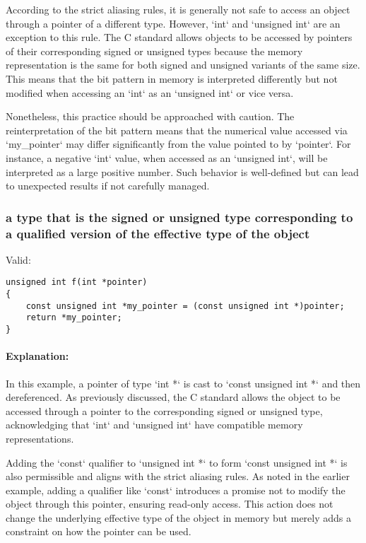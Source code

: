 \documentclass[12pt]{article}
\begin{document}
According to the strict aliasing rules, it is generally not safe to access an object through a pointer of a different type. However, `int` and `unsigned int` are an exception to this rule. The C standard allows objects to be accessed by pointers of their corresponding signed or unsigned types because the memory representation is the same for both signed and unsigned variants of the same size. This means that the bit pattern in memory is interpreted differently but not modified when accessing an `int` as an `unsigned int` or vice versa.

Nonetheless, this practice should be approached with caution. The reinterpretation of the bit pattern means that the numerical value accessed via `my\_pointer` may differ significantly from the value pointed to by `pointer`. For instance, a negative `int` value, when accessed as an `unsigned int`, will be interpreted as a large positive number. Such behavior is well-defined but can lead to unexpected results if not carefully managed.

\subsubsection{a type that is the signed or unsigned type corresponding to a qualified version of the effective type of the object}

Valid:
\begin{verbatim}
unsigned int f(int *pointer)
{
    const unsigned int *my_pointer = (const unsigned int *)pointer;
    return *my_pointer;
}
\end{verbatim}

\paragraph{Explanation:}
In this example, a pointer of type `int *` is cast to `const unsigned int *` and then dereferenced. As previously discussed, the C standard allows the object to be accessed through a pointer to the corresponding signed or unsigned type, acknowledging that `int` and `unsigned int` have compatible memory representations.

Adding the `const` qualifier to `unsigned int *` to form `const unsigned int *` is also permissible and aligns with the strict aliasing rules. As noted in the earlier example, adding a qualifier like `const` introduces a promise not to modify the object through this pointer, ensuring read-only access. This action does not change the underlying effective type of the object in memory but merely adds a constraint on how the pointer can be used.
\end{document}
